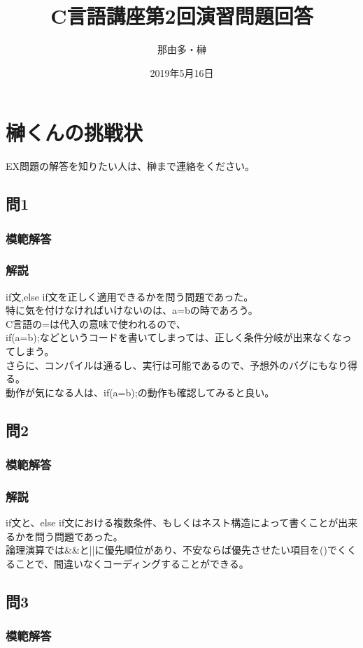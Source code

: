 \documentclass[a4j,titlepage,dvipdfmx]{jsarticle}   %
\title{C言語講座第2回演習問題回答}
\author{那由多・榊}
\date{2019年5月16日}
\newcommand{\codepath}{./code/02_Answer}
\begin{document}
\section{榊くんの挑戦状}
EX問題の解答を知りたい人は、榊まで連絡をください。
\subsection{問1}
\subsubsection{模範解答}

\subsubsection{解説}
if文,else if文を正しく適用できるかを問う問題であった。\\
特に気を付けなければいけないのは、a=bの時であろう。\\
C言語の=は代入の意味で使われるので、\\
if(a=b){;}などというコードを書いてしまっては、正しく条件分岐が出来なくなってしまう。\\
さらに、コンパイルは通るし、実行は可能であるので、予想外のバグにもなり得る。\\
動作が気になる人は、if(a=b){;}の動作も確認してみると良い。\\

\subsection{問2}
\subsubsection{模範解答}

\subsubsection{解説}
if文と、else if文における複数条件、もしくはネスト構造によって書くことが出来るかを問う問題であった。\\
論理演算では&&と||に優先順位があり、不安ならば優先させたい項目を()でくくることで、間違いなくコーディングすることができる。\\
\subsection{問3}
\subsubsection{模範解答}

\end{document}

